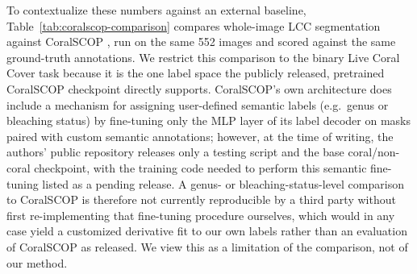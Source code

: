 \documentclass[11pt]{elsarticle}
\begin{document}
To contextualize these numbers against an external baseline, Table~\ref{tab:coralscop-comparison} compares whole-image LCC segmentation against CoralSCOP \citep{zheng2024}, run on the same 552 images and scored against the same ground-truth annotations. We restrict this comparison to the binary Live Coral Cover task because it is the one label space the publicly released, pretrained CoralSCOP checkpoint directly supports. CoralSCOP's own architecture does include a mechanism for assigning user-defined semantic labels (e.g.\ genus or bleaching status) by fine-tuning only the MLP layer of its label decoder on masks paired with custom semantic annotations; however, at the time of writing, the authors' public repository releases only a testing script and the base coral/non-coral checkpoint, with the training code needed to perform this semantic fine-tuning listed as a pending release. A genus- or bleaching-status-level comparison to CoralSCOP is therefore not currently reproducible by a third party without first re-implementing that fine-tuning procedure ourselves, which would in any case yield a customized derivative fit to our own labels rather than an evaluation of CoralSCOP as released. We view this as a limitation of the comparison, not of our method.
\end{document}
